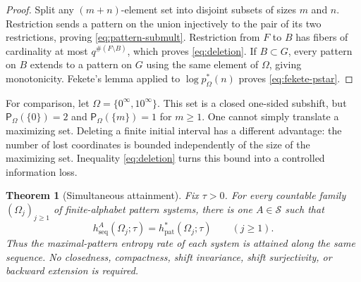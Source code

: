 \documentclass[11pt,reqno]{amsart}
\numberwithin{equation}{section}
\newtheorem{theorem}{Theorem}[section]
\theoremstyle{definition}
\newcommand{\Patt}{\mathsf P}
\newcommand{\hseq}{h_{\mathrm{seq}}}
\newcommand{\hpat}{h_{\mathrm{pat}}^{*}}
\begin{document}
\begin{proof}
Split any $(m+n)$-element set into disjoint subsets of sizes $m$ and $n$.
Restriction sends a pattern on the union injectively to the pair of its two
restrictions, proving \eqref{eq:pattern-submult}.  Restriction from $F$ to
$B$ has fibers of cardinality at most $q^{\#(F\setminus B)}$, which proves
\eqref{eq:deletion}.  If $B\subset G$, every pattern on $B$ extends to a
pattern on $G$ using the same element of $\Omega$, giving monotonicity.
Fekete's lemma applied to $\log p_\Omega^*(n)$ proves
\eqref{eq:fekete-pstar}.
\end{proof}

For comparison, let $\Omega=\{0^\infty,10^\infty\}$. This set is a
closed one-sided subshift, but
$\Patt_\Omega(\{0\})=2$ and $\Patt_\Omega(\{m\})=1$ for $m\ge1$.
One cannot simply translate a maximizing set. Deleting a finite initial
interval has a different advantage: the number of lost coordinates is
bounded independently of the size of the maximizing set. Inequality
\eqref{eq:deletion} turns this bound into a controlled information loss.

\begin{theorem}[Simultaneous attainment]\label{thm:A}
Fix $\tau>0$.  For every countable family
$(\Omega_j)_{j\ge1}$ of finite-alphabet pattern systems, there is one
$A\in\mathscr S$ such that
\begin{equation}\label{eq:simultaneous-attainment}
 \hseq^A(\Omega_j;\tau)=\hpat(\Omega_j;\tau)
 \qquad(j\ge1).
\end{equation}
Thus the maximal-pattern entropy rate of each system is attained along the same
sequence.  No closedness, compactness, shift invariance, shift surjectivity, or
backward extension is required.
\end{theorem}
\end{document}
